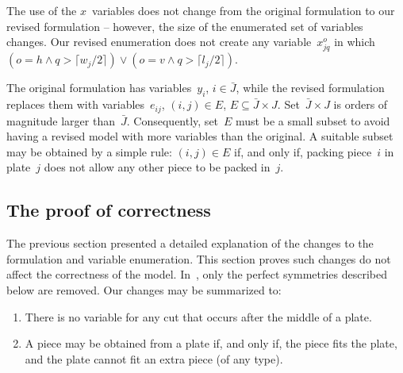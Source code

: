\documentclass[smallextended]{svjour3}       %
\begin{document}
The use of the \(x\)~variables does not change from the original formulation to our revised formulation -- however, the size of the enumerated set of variables changes.
Our revised enumeration does not create any variable~\(x^o_{jq}\) in which \((o = h \land q > \lceil w_j / 2 \rceil) \lor (o = v \land q > \lceil l_j / 2 \rceil)\).

The original formulation has variables~\(y_i\), \(i \in \bar{J}\), while the revised formulation replaces them with variables~\(e_{ij}\), \((i, j) \in E\), \(E \subseteq \bar{J} \times J\).
Set~\(\bar{J} \times J\) is orders of magnitude larger than~\(\bar{J}\).
Consequently, set~\(E\) must be a small subset to avoid having a revised model with more variables than the original.
A suitable subset may be obtained by a simple rule: \((i, j) \in E\) if, and only if, packing piece~\(i\) in plate~\(j\) does not allow any other piece to be packed in~\(j\).


\subsection{The proof of correctness}

The previous section presented a detailed explanation of the changes to the formulation and variable enumeration.
This section proves such changes do not affect the correctness of the model.
In~\cite{furini:2016}, only the perfect symmetries described below are removed.
Our changes may be summarized to:

\begin{enumerate}
\item There is no variable for any cut that occurs after the middle of a plate.
\item A piece may be obtained from a plate if, and only if, the piece fits the plate, and the plate cannot fit an extra piece (of any type).
\end{enumerate}
\end{document}
